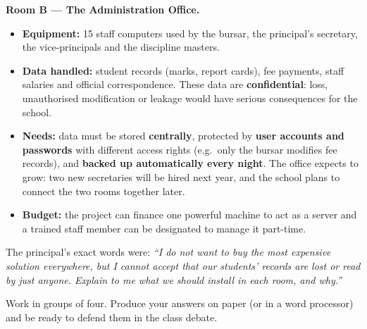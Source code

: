 \documentclass[11pt]{article}
\newcounter{popsec}
\newcounter{popsub}
\newcommand{\courssub}[1]{%
  \stepcounter{popsub}%
  \par\vspace{9pt}\noindent{\popxbold\fontsize{11.5}{13}\selectfont\color{popink}{\color{poporange}\thepopsec.\thepopsub}\hspace{6pt}#1}\par\nopagebreak\vspace{4pt}
}
\begin{document}
\textbf{Room B --- The Administration Office.}
\begin{itemize}
\item \textbf{Equipment:} 15 staff computers used by the bursar, the principal's secretary, the vice-principals and the discipline masters.
\item \textbf{Data handled:} student records (marks, report cards), fee payments, staff salaries and official correspondence. These data are \textbf{confidential}: loss, unauthorised modification or leakage would have serious consequences for the school.
\item \textbf{Needs:} data must be stored \textbf{centrally}, protected by \textbf{user accounts and passwords} with different access rights (e.g.\ only the bursar modifies fee records), and \textbf{backed up automatically every night}. The office expects to grow: two new secretaries will be hired next year, and the school plans to connect the two rooms together later.
\item \textbf{Budget:} the project can finance one powerful machine to act as a server and a trained staff member can be designated to manage it part-time.
\end{itemize}

The principal's exact words were: \emph{``I do not want to buy the most expensive solution everywhere, but I cannot accept that our students' records are lost or read by just anyone. Explain to me what we should install in each room, and why.''}

\courssub{Tasks}

Work in groups of four. Produce your answers on paper (or in a word processor) and be ready to defend them in the class debate.
\end{document}
